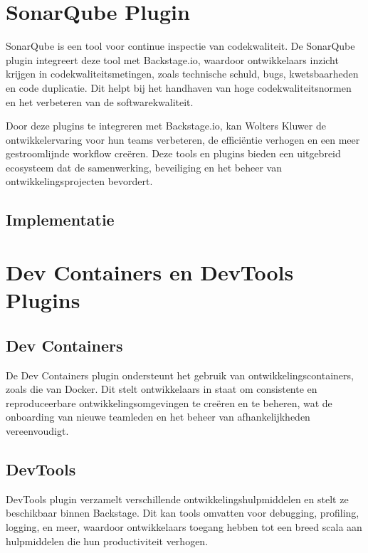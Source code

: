 \section{SonarQube Plugin}

SonarQube is een tool voor continue inspectie van codekwaliteit. De SonarQube plugin integreert deze tool met Backstage.io, waardoor ontwikkelaars inzicht krijgen in codekwaliteitsmetingen, zoals technische schuld, bugs, kwetsbaarheden en code duplicatie. Dit helpt bij het handhaven van hoge codekwaliteitsnormen en het verbeteren van de softwarekwaliteit.

Door deze plugins te integreren met Backstage.io, kan Wolters Kluwer de ontwikkelervaring voor hun teams verbeteren, de efficiëntie verhogen en een meer gestroomlijnde workflow creëren. Deze tools en plugins bieden een uitgebreid ecosysteem dat de samenwerking, beveiliging en het beheer van ontwikkelingsprojecten bevordert.

\subsection{Implementatie}

\section{Dev Containers en DevTools Plugins}

\subsection{Dev Containers}

De Dev Containers plugin ondersteunt het gebruik van ontwikkelingscontainers, zoals die van Docker. Dit stelt ontwikkelaars in staat om consistente en reproduceerbare ontwikkelingsomgevingen te creëren en te beheren, wat de onboarding van nieuwe teamleden en het beheer van afhankelijkheden vereenvoudigt.

\subsection{DevTools}

DevTools plugin verzamelt verschillende ontwikkelingshulpmiddelen en stelt ze beschikbaar binnen Backstage. Dit kan tools omvatten voor debugging, profiling, logging, en meer, waardoor ontwikkelaars toegang hebben tot een breed scala aan hulpmiddelen die hun productiviteit verhogen.

